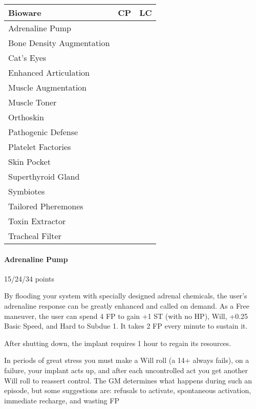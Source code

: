 \begin{multicols*}{3}
	\begin{center}
		\begin{tabularx}{0.32\textwidth}{|X|c|c|}
			\hline
			Bioware & CP & LC\\
			\hline
			\hline
			Adrenaline Pump & & \\
			Bone Density Augmentation & & \\
			Cat's Eyes & & \\
			Enhanced Articulation & & \\
			Muscle Augmentation & & \\
			Muscle Toner & & \\
			Orthoskin & & \\
			Pathogenic Defense & & \\
			Platelet Factories & & \\
			Skin Pocket & & \\
			Superthyroid Gland & & \\
			Symbiotes & & \\
			Tailored Pheremones & & \\
			Toxin Extractor & & \\
			Tracheal Filter & & \\
			\hline
		\end{tabularx}
	\end{center}
	
	\paragraph{Adrenaline Pump}
	\begin{flushright}
		15/24/34 points
	\end{flushright}
	
	By flooding your system with specially designed adrenal chemicals, the user's adrenaline response can be greatly enhanced and called on demand. As a Free maneuver, the user can spend 4 FP to gain +1 ST (with no HP), Will, +0.25 Basic Speed, and Hard to Subdue 1. It takes 2 FP every minute to sustain it. 
	
	After shutting down, the implant requires 1 hour to regain its resources. 
	
	In periods of great stress you  must make a Will roll (a 14+ always fails), on a failure, your implant acts up, and after each uncontrolled act you get another Will roll to reassert control. The GM determines what happens during such an episode, but some suggestions are: refusals to activate, spontaneous activation, immediate recharge, and wasting FP
	

\end{multicols*}
